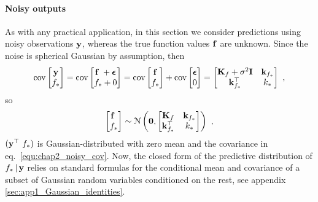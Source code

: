       \paragraph{Noisy outputs} As with any practical application, in this
      section we consider predictions using noisy observations $\mathbf{y}$,
      whereas the true function values $\mathbf{f}$ are unknown.
      Since the noise is spherical Gaussian by assumption, then
      \begin{equation} \label{equ:chap2_noisy_cov}
	\textrm{cov}\begin{bmatrix}  \mathbf{y} \\ f_* \end{bmatrix} =  \textrm{cov}\begin{bmatrix}  \mathbf{f}_{~} + \boldsymbol{\epsilon} \\ f_* + 0 \end{bmatrix} = \textrm{cov} \begin{bmatrix}  \mathbf{f} \\ f_* \end{bmatrix} + \textrm{cov}\begin{bmatrix}  \boldsymbol{\epsilon} \\ 0 \end{bmatrix}
	= \begin{bmatrix}  \mathbf{K}_f + \sigma^2 \mathbf{I} &\mathbf{k}_{f_*} \\ \mathbf{k}_{f_*}^\top &k_*  \end{bmatrix} ~,
      \end{equation}
      so
      \begin{equation} \label{equ:chap2_noisy_marginal}
	\begin{bmatrix}  \mathbf{f}_{~} \\ f_*  \end{bmatrix} \sim \mathcal{N} \left(  \mathbf{0} ,  \begin{bmatrix}  \mathbf{K}_f &\mathbf{k}_{f_*} \\ \mathbf{k}_{f_*}^\top &k_*  \end{bmatrix}  \right) ~,
      \end{equation}
      $(\mathbf{y}^\top ~  f_* )$ is Gaussian-distributed with zero mean and
      the covariance in eq.~\eqref{equ:chap2_noisy_cov}. Now, the closed form of the predictive distribution of
      $f_* \,|\, \mathbf{y}$ relies on standard formulas for the conditional mean and
      covariance of a subset of Gaussian random variables conditioned on the
      rest, see appendix \ref{sec:app1_Gaussian_identities}.



